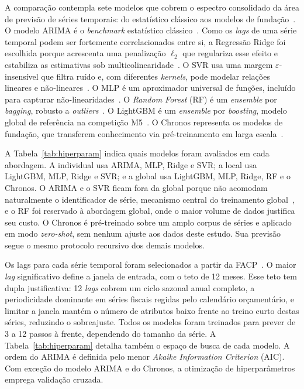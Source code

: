 \documentclass[12pt]{article}
\begin{document}
A comparação contempla sete modelos que cobrem o espectro consolidado da área de previsão de séries temporais: do estatístico clássico aos modelos de fundação~\cite{masini2023machine}. O modelo ARIMA é o \textit{benchmark} estatístico clássico~\cite{box2008time}. Como os \textit{lags} de uma série temporal podem ser fortemente correlacionados entre si, a Regressão Ridge foi escolhida porque acrescenta uma penalização $\ell_2$ que regulariza esse efeito e estabiliza as estimativas sob multicolinearidade~\cite{safari2025signature}. O SVR usa uma margem $\varepsilon$-insensível que filtra ruído e, com diferentes \textit{kernels}, pode modelar relações lineares e não-lineares~\cite{duarte2025improving}. O MLP é um aproximador universal de funções, incluído para capturar não-linearidades~\cite{duarte2025improving}. O \emph{Random Forest} (RF) é um \textit{ensemble} por \textit{bagging}, robusto a \textit{outliers}~\cite{breiman2001random}. O LightGBM é um \textit{ensemble} por \textit{boosting}, modelo global de referência na competição M5~\cite{makridakis2022m5}. O Chronos representa os modelos de fundação, que transferem conhecimento via pré-treinamento em larga escala~\cite{ansari2024chronos}.

A Tabela~\ref{tab:hiperparam} indica quais modelos foram avaliados em cada abordagem. A individual usa ARIMA, MLP, Ridge e SVR; a local usa LightGBM, MLP, Ridge e SVR; e a global usa LightGBM, MLP, Ridge, RF e o Chronos. O ARIMA e o SVR ficam fora da global porque não acomodam naturalmente o identificador de série, mecanismo central do treinamento global~\cite{montero2021principles}, e o RF foi reservado à abordagem global, onde o maior volume de dados justifica seu custo. O Chronos é pré-treinado sobre um amplo corpus de séries e aplicado em modo \textit{zero-shot}, sem nenhum ajuste aos dados deste estudo. Sua previsão segue o mesmo protocolo recursivo dos demais modelos.

Os lags para cada série temporal foram selecionados a partir da FACP~\cite{box2008time}. O maior \textit{lag} significativo define a janela de entrada, com o teto de 12 meses. Esse teto tem dupla justificativa: 12 \textit{lags} cobrem um ciclo sazonal anual completo, a periodicidade dominante em séries fiscais regidas pelo calendário orçamentário, e limitar a janela mantém o número de atributos baixo frente ao treino curto destas séries, reduzindo o sobreajuste. Todos os modelos foram treinados para prever de 3 a 12 passos à frente, dependendo do tamanho da série. A Tabela~\ref{tab:hiperparam} detalha também o espaço de busca de cada modelo. A ordem do ARIMA é definida pelo menor \emph{Akaike Information Criterion} (AIC). Com exceção do modelo ARIMA e do Chronos, a otimização de hiperparâmetros emprega validação cruzada.
\end{document}
